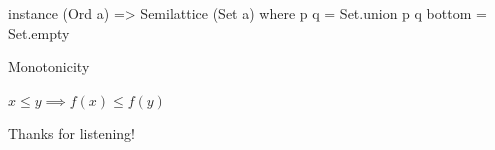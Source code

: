 \documentclass[UKenglish,usenames,dvipsnames,svgnames,table,aspectratio=169,mathserif]{beamer}
\newcommand{\nl}{\vspace{\baselineskip}}
\begin{document}
\begin{frame}[fragile]
\begin{haskellcode}
instance (Ord a) => Semilattice (Set a) where
  p \/ q = Set.union p q
  bottom = Set.empty
\end{haskellcode}
\end{frame}


\begin{frame}

\centering \huge
Monotonicity
\nl

\Large

$ x \leq y \implies f(x) \leq f(y)$

\end{frame}



\begin{frame}
\huge \centering
Thanks for listening!
\end{frame}
\end{document}
